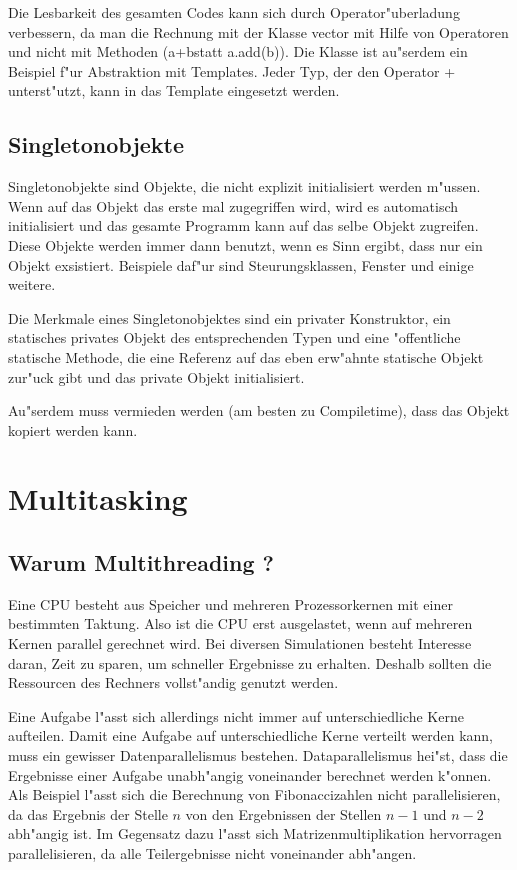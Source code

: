 \documentclass[14pt, a4paper]{report}
\begin{document}
Die Lesbarkeit des gesamten Codes kann sich durch Operator"uberladung verbessern, da man
die Rechnung mit der Klasse vector mit Hilfe von Operatoren und nicht mit Methoden (\glqq a+b\grqq statt \glqq a.add(b)\grqq). Die Klasse ist au"serdem ein Beispiel f"ur 
Abstraktion mit Templates. Jeder
Typ, der den Operator + unterst"utzt, kann in das Template eingesetzt werden.

\section{Singletonobjekte}
Singletonobjekte sind Objekte, die nicht explizit initialisiert werden m"ussen. Wenn auf
das Objekt das erste mal zugegriffen wird, wird es automatisch initialisiert und das
gesamte Programm kann auf das selbe Objekt zugreifen. Diese Objekte werden immer
dann benutzt, wenn es Sinn ergibt, dass nur ein Objekt exsistiert. Beispiele daf"ur
sind Steurungsklassen, Fenster und einige weitere.

Die Merkmale eines Singletonobjektes sind ein privater Konstruktor, ein statisches 
privates Objekt des entsprechenden Typen und eine "offentliche statische Methode, die 
eine Referenz auf das eben erw"ahnte statische Objekt zur"uck gibt und das private
Objekt initialisiert.

Au"serdem muss vermieden werden (am besten zu Compiletime), dass das Objekt 
kopiert werden kann.

\chapter{Multitasking}
\section{Warum Multithreading ?}
Eine CPU besteht aus Speicher und mehreren Prozessorkernen mit einer bestimmten
Taktung. Also ist die CPU erst ausgelastet, wenn auf mehreren Kernen parallel
gerechnet wird. Bei diversen Simulationen besteht Interesse daran, Zeit zu sparen, um
schneller Ergebnisse zu erhalten. Deshalb sollten die Ressourcen des Rechners 
vollst"andig genutzt werden.

Eine Aufgabe l"asst sich allerdings nicht immer auf unterschiedliche Kerne aufteilen.
Damit eine Aufgabe auf unterschiedliche Kerne verteilt werden kann, muss ein gewisser
Datenparallelismus bestehen. Dataparallelismus hei"st, dass die Ergebnisse einer Aufgabe
unabh"angig voneinander berechnet werden k"onnen. Als Beispiel l"asst sich die
Berechnung von Fibonaccizahlen nicht parallelisieren, da das Ergebnis der Stelle $n$ von
den Ergebnissen der Stellen $n-1$ und $n-2$ abh"angig ist. Im Gegensatz dazu l"asst sich
Matrizenmultiplikation hervorragen parallelisieren, da alle Teilergebnisse nicht voneinander
abh"angen.
\end{document}
